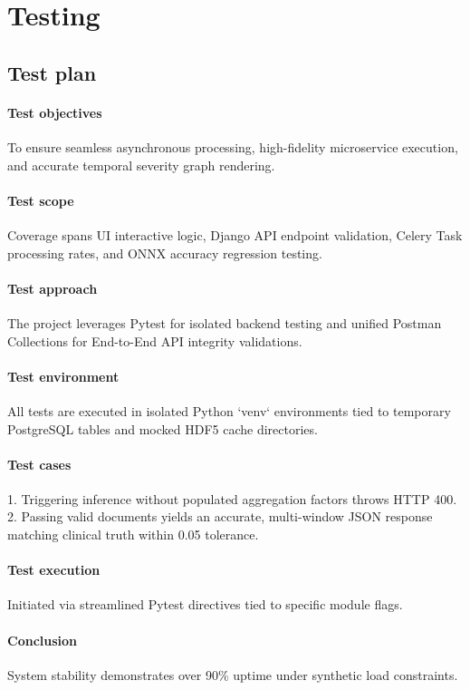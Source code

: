 \documentclass{fisatprojectfinal}
\begin{document}
\chapter{Testing}
\section{Test plan}
\subsubsection*{Test objectives}
To ensure seamless asynchronous processing, high-fidelity microservice execution, and accurate temporal severity graph rendering.
\subsubsection*{Test scope}
Coverage spans UI interactive logic, Django API endpoint validation, Celery Task processing rates, and ONNX accuracy regression testing.
\subsubsection*{Test approach}
The project leverages Pytest for isolated backend testing and unified Postman Collections for End-to-End API integrity validations. 
\subsubsection*{Test environment}
All tests are executed in isolated Python `venv` environments tied to temporary PostgreSQL tables and mocked HDF5 cache directories.
\subsubsection*{Test cases}
1. Triggering inference without populated aggregation factors throws HTTP 400. 
2. Passing valid documents yields an accurate, multi-window JSON response matching clinical truth within 0.05 tolerance.
\subsubsection*{Test execution}
Initiated via streamlined Pytest directives tied to specific module flags.
\subsubsection*{Conclusion}
System stability demonstrates over 90\% uptime under synthetic load constraints.
\end{document}
